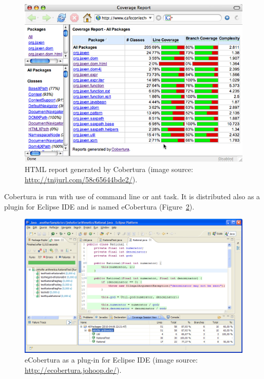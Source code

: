 \begin{figure}[h!]
	\centering
	\includegraphics[scale=0.5]{img/coverage.jpg} 
	\caption{HTML report generated by Cobertura (image source: \url{http://tnijurl.com/58c65644bde2/}).}		
	\label{fig:coverage1}
\end{figure}

Cobertura is run with use of command line or ant task. It is distributed also as a plugin for Eclipse IDE and is named eCobertura (Figure~\ref{fig:coverage2}). 

\begin{figure}[h!]
	\centering
	\includegraphics[scale=0.4]{img/screenshot_ecobertura_01.png}  
	\caption{eCobertura as a plug-in for Eclipse IDE (image source: \url{http://ecobertura.johoop.de/}).}		
	\label{fig:coverage2}
\end{figure}



